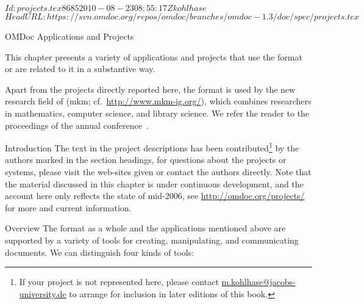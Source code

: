 \svnInfo $Id: projects.tex 8685 2010-08-23 08:55:17Z kohlhase $
\svnKeyword $HeadURL: https://svn.omdoc.org/repos/omdoc/branches/omdoc-1.3/doc/spec/projects.tex $

\begin{tchapter}[id=projects,short=Applications and Projects]{OMDoc Applications and Projects}

  This chapter presents a variety of applications and projects that use the {\omdoc}
  format or are related to it in a substantive way.  

  Apart from the projects directly reported here, the {\omdoc} format is used by the new
  research field of {} ({\sc mkm};
  cf.~\url{http://www.mkm-ig.org/}), which combines researchers in mathematics, computer
  science, and library science. We refer the reader to the proceedings of the annual
  {} conference~\cite{MKM01,MKM03,MKM04,MKM05,MKM06}.


\begin{tsection}[id=projeccts-intro]{Introduction}
  The text in the project descriptions has been contributed\footnote{If your {\omdoc}
    project is not represented here, please contact \url{m.kohlhase@jacobs-university.de} to arrange
    for inclusion in later editions of this book.} by the authors marked in the section
  headings, for questions about the projects or systems, please visit the web-sites given
  or contact the authors directly. Note that the material discussed in this chapter is
  under continuous development, and the account here only reflects the state of mid-2006,
  see \url{http://omdoc.org/projects/} for more and current information.


\begin{tsubsection}[id=projects-overview]{Overview}
  The {\omdoc} format as a whole and the applications mentioned above are supported by a
  variety of tools for creating, manipulating, and communicating {\omdoc} documents. We
  can distinguish four kinds of tools:


\end{tsubsection}
\end{tsection}
\end{tchapter}
